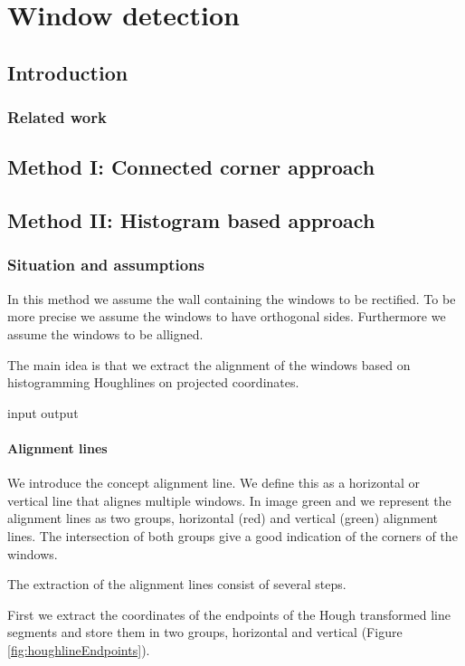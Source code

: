 \section{Window detection}
\label{chap:windowDetection}
\subsection{Introduction}
\subsubsection{Related work}

\subsection{Method I: Connected corner approach} 
\subsection{Method II: Histogram based approach} 
\subsubsection{Situation and assumptions}
In this method we assume the wall containing the windows to be rectified.
To be more precise we assume the windows to have orthogonal sides.
Furthermore we assume the windows to be alligned.

The main idea is that we extract the alignment of the windows based on
histogramming Houghlines on projected coordinates.

input 
output


\paragraph{Alignment lines}
We introduce the concept alignment line. We define this as a horizontal or
vertical line that alignes multiple windows. In image %
green and we represent the alignment lines as two groups, horizontal (red) and
vertical (green) alignment lines. The intersection of both groups give a good
indication of the corners of the windows.

The extraction of the alignment lines consist of several steps.

First we extract the coordinates of the endpoints of the Hough transformed line
segments and store them in two groups, horizontal and vertical (Figure
\ref{fig:houghlineEndpoints}). 

